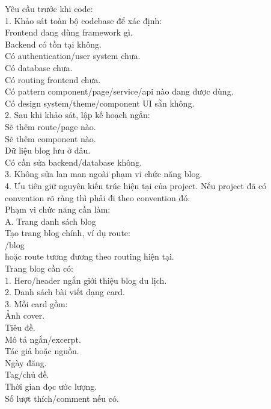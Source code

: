 \begin{enumerate}
Yêu cầu trước khi code: \\

1. Khảo sát toàn bộ codebase để xác định: \\
\* Frontend đang dùng framework gì. \\
\* Backend có tồn tại không. \\
\* Có authentication/user system chưa. \\
\* Có database chưa. \\
\* Có routing frontend chưa. \\
\* Có pattern component/page/service/api nào đang được dùng. \\
\* Có design system/theme/component UI sẵn không. \\

2. Sau khi khảo sát, lập kế hoạch ngắn: \\
\* Sẽ thêm route/page nào. \\
\* Sẽ thêm component nào. \\
\* Dữ liệu blog lưu ở đâu. \\
\* Có cần sửa backend/database không. \\

3. Không sửa lan man ngoài phạm vi chức năng blog. \\
4. Ưu tiên giữ nguyên kiến trúc hiện tại của project. Nếu project đã có convention rõ ràng thì phải đi theo convention đó. \\

Phạm vi chức năng cần làm: \\

A. Trang danh sách blog \\
Tạo trang blog chính, ví dụ route: \\
\* /blog \\
      hoặc route tương đương theo routing hiện tại. \\


Trang blog cần có: \\

1. Hero/header ngắn giới thiệu blog du lịch. \\
2. Danh sách bài viết dạng card. \\
3. Mỗi card gồm: \\
\* Ảnh cover. \\
\* Tiêu đề. \\
\* Mô tả ngắn/excerpt. \\
\* Tác giả hoặc nguồn. \\
\* Ngày đăng. \\
\* Tag/chủ đề. \\
\* Thời gian đọc ước lượng. \\
\* Số lượt thích/comment nếu có. \\


\end{enumerate}
